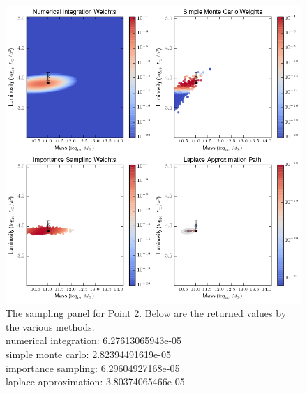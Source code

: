\documentclass[\docopts]{\docclass}
\begin{document}
\begin{figure}[!h]
\centering
\includegraphics[width=0.9\columnwidth]{point3.png}
\caption{
The sampling panel for Point 2. Below are the returned values by the various methods.\\
numerical integration: 6.27613065943e-05\\
simple monte carlo: 2.82394491619e-05\\
importance sampling: 6.29604927168e-05\\
laplace approximation: 3.80374065466e-05\\
\label{fig:point3}}
\end{figure}
\end{document}
